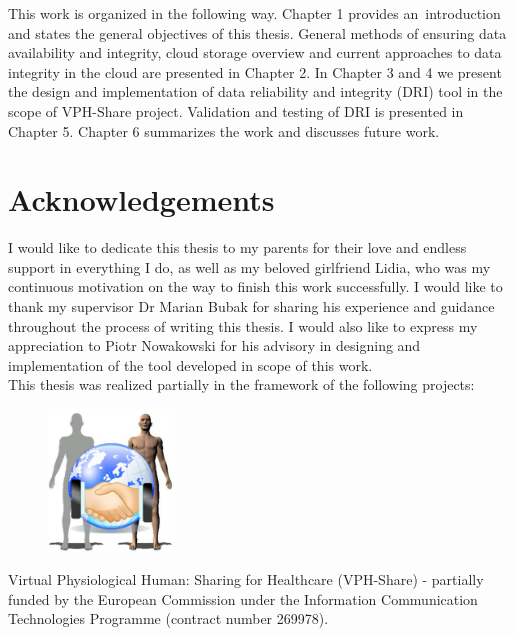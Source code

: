 \documentclass[pdflatex,en]{aghdpl}  %
\begin{document}
This work is organized in the following way. Chapter 1 provides an~introduction and states
the general objectives of this thesis. General methods of ensuring data availability and
integrity, cloud storage overview and current approaches to data integrity in the cloud are
presented in Chapter 2. In Chapter 3 and 4 we present the design and implementation of data
reliability and integrity (DRI) tool in the scope of VPH-Share project. Validation and testing
of DRI is presented in Chapter 5. Chapter 6 summarizes the work and discusses future work. 


\chapter*{Acknowledgements}
{}
I would like to dedicate this thesis to my parents for their love and endless
support in everything I do, as well as my beloved girlfriend Lidia, who was my continuous 
motivation on the way to finish this work successfully. I would like to thank my supervisor
Dr Marian Bubak for sharing his experience and guidance throughout the process of writing this
thesis. I would also like to express my appreciation to Piotr Nowakowski for his advisory in
designing and implementation of the tool developed in scope of this work.\\

This thesis was realized partially in the framework of the following projects:

\begin{figure}[h!]
	\centering
	\includegraphics[width=0.3\textwidth]{images/vph-logo.png}
\end{figure}

Virtual Physiological Human: Sharing for Healthcare (VPH-Share) - partially
funded by the European Commission under the Information Communication
Technologies Programme (contract number 269978).
 

\clearpage
\tableofcontents
\clearpage
{}
{}
\listoffigures
\clearpage
{}
{}
\listoftables
\clearpage
{}
{}
\printnomenclature
\clearpage
\end{document}
